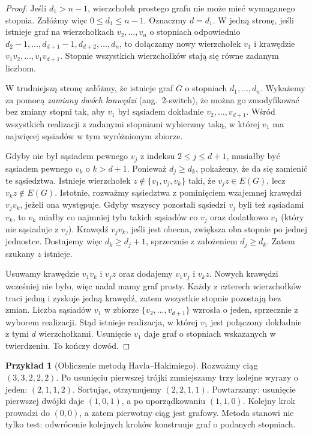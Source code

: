 \documentclass[11pt,a4paper]{report}
\numberwithin{equation}{section}
\theoremstyle{plain}
\theoremstyle{definition}
\newtheorem{przyklad}[twierdzenie]{Przykład}
\theoremstyle{remark}
\begin{document}
\begin{proof}
Jeśli $d_1>n-1$, wierzchołek prostego grafu
nie może mieć wymaganego stopnia. Załóżmy więc
$0\le d_1\le n-1$. Oznaczmy $d=d_1$.
W jedną stronę, jeśli istnieje graf na wierzchołkach
$v_2,\ldots,v_n$ o stopniach odpowiednio
$d_2-1,\ldots,d_{d+1}-1,d_{d+2},\ldots,d_n$,
to dołączamy nowy wierzchołek $v_1$ i krawędzie
$v_1v_2,\ldots,v_1v_{d+1}$. Stopnie wszystkich
wierzchołków stają się równe zadanym liczbom.

W trudniejszą stronę załóżmy, że istnieje graf $G$
o stopniach $d_1,\ldots,d_n$. Wykażemy za pomocą
\emph{zamiany dwóch krawędzi} (ang.\ $2$-switch), że
można go zmodyfikować bez zmiany stopni tak,
aby $v_1$ był sąsiadem dokładnie $v_2,\ldots,v_{d+1}$.
Wśród wszystkich realizacji z zadanymi stopniami
wybierzmy taką, w której $v_1$ ma najwięcej
sąsiadów w tym wyróżnionym zbiorze.

Gdyby nie był sąsiadem pewnego $v_j$ z indeksu
$2\le j\le d+1$, musiałby być sąsiadem pewnego
$v_k$ o $k>d+1$. Ponieważ $d_j\ge d_k$, pokażemy,
że da się zamienić te sąsiedztwa. Istnieje
wierzchołek $z\notin\{v_1,v_j,v_k\}$ taki,
że $v_jz\in E(G)$, lecz $v_kz\notin E(G)$.
Istotnie, rozważmy sąsiedztwa z pominięciem
wzajemnej krawędzi $v_jv_k$, jeżeli ona występuje.
Gdyby wszyscy pozostali sąsiedzi $v_j$ byli też
sąsiadami $v_k$, to $v_k$ miałby co najmniej
tylu takich sąsiadów co $v_j$ oraz dodatkowo
$v_1$ (który nie sąsiaduje z $v_j$).
Krawędź $v_jv_k$, jeśli jest obecna, zwiększa oba
stopnie po jednej jednostce. Dostajemy więc
$d_k\ge d_j+1$, sprzecznie z założeniem
$d_j\ge d_k$. Zatem szukany $z$ istnieje.

Usuwamy krawędzie $v_1v_k$ i $v_jz$ oraz
dodajemy $v_1v_j$ i $v_kz$. Nowych krawędzi
wcześniej nie było, więc nadal mamy graf prosty.
Każdy z czterech wierzchołków traci jedną i zyskuje
jedną krawędź, zatem wszystkie stopnie pozostają
bez zmian. Liczba sąsiadów $v_1$ w zbiorze
$\{v_2,\ldots,v_{d+1}\}$ wzrosła o jeden,
sprzecznie z wyborem realizacji. Stąd istnieje
realizacja, w której $v_1$ jest połączony
dokładnie z tymi $d$ wierzchołkami.
Usunięcie $v_1$ daje graf o stopniach wskazanych
w twierdzeniu. To kończy dowód.
\end{proof}

\begin{przyklad}[Obliczenie metodą Havla--Hakimiego]
Rozważmy ciąg $(3,3,2,2,2)$. Po usunięciu
pierwszej trójki zmniejszamy trzy kolejne wyrazy o jeden:
$(2,1,1,2)$. Sortując, otrzymujemy $(2,2,1,1)$.
Powtarzamy: usunięcie pierwszej dwójki daje
$(1,0,1)$, a po uporządkowaniu $(1,1,0)$.
Kolejny krok prowadzi do $(0,0)$, a zatem
pierwotny ciąg jest grafowy. Metoda stanowi
nie tylko test: odwrócenie kolejnych kroków
konstruuje graf o podanych stopniach.
\end{przyklad}
\end{document}
